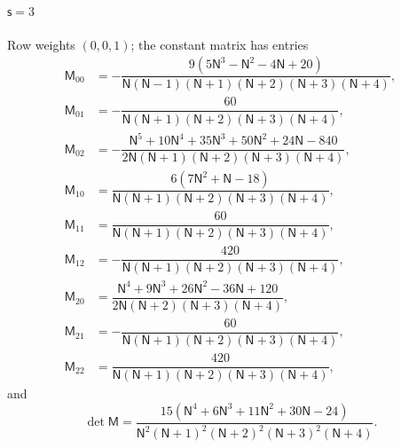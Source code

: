 \documentclass{amsart}
\theoremstyle{definition}
\theoremstyle{remark}
\numberwithin{equation}{section}
\begin{document}
\paragraph{$\mathsf s=3$} Row weights $(0,0,1)$; the constant matrix has entries
{\small\allowdisplaybreaks\begin{align*}
  \mathsf M_{00}&=-\dfrac{9(5\mathsf N^{3} - \mathsf N^{2} - 4\mathsf N + 20)}{\mathsf N(\mathsf N - 1)(\mathsf N + 1)(\mathsf N + 2)(\mathsf N + 3)(\mathsf N + 4)},\\
  \mathsf M_{01}&=-\dfrac{60}{\mathsf N(\mathsf N + 1)(\mathsf N + 2)(\mathsf N + 3)(\mathsf N + 4)},\\
  \mathsf M_{02}&=-\dfrac{\mathsf N^{5} + 10\mathsf N^{4} + 35\mathsf N^{3} + 50\mathsf N^{2} + 24\mathsf N - 840}{2\mathsf N(\mathsf N + 1)(\mathsf N + 2)(\mathsf N + 3)(\mathsf N + 4)},\\
  \mathsf M_{10}&=\dfrac{6(7\mathsf N^{2} + \mathsf N - 18)}{\mathsf N(\mathsf N + 1)(\mathsf N + 2)(\mathsf N + 3)(\mathsf N + 4)},\\
  \mathsf M_{11}&=\dfrac{60}{\mathsf N(\mathsf N + 1)(\mathsf N + 2)(\mathsf N + 3)(\mathsf N + 4)},\\
  \mathsf M_{12}&=-\dfrac{420}{\mathsf N(\mathsf N + 1)(\mathsf N + 2)(\mathsf N + 3)(\mathsf N + 4)},\\
  \mathsf M_{20}&=\dfrac{\mathsf N^{4} + 9\mathsf N^{3} + 26\mathsf N^{2} - 36\mathsf N + 120}{2\mathsf N(\mathsf N + 2)(\mathsf N + 3)(\mathsf N + 4)},\\
  \mathsf M_{21}&=-\dfrac{60}{\mathsf N(\mathsf N + 1)(\mathsf N + 2)(\mathsf N + 3)(\mathsf N + 4)},\\
  \mathsf M_{22}&=\dfrac{420}{\mathsf N(\mathsf N + 1)(\mathsf N + 2)(\mathsf N + 3)(\mathsf N + 4)},
\end{align*}}
and
\[\det\mathsf M=\frac{15(\mathsf N^{4} + 6\mathsf N^{3} + 11\mathsf N^{2} + 30\mathsf N - 24)}{\mathsf N^{2}(\mathsf N + 1)^{2}(\mathsf N + 2)^{2}(\mathsf N + 3)^{2}(\mathsf N + 4)}.\]
\end{document}
